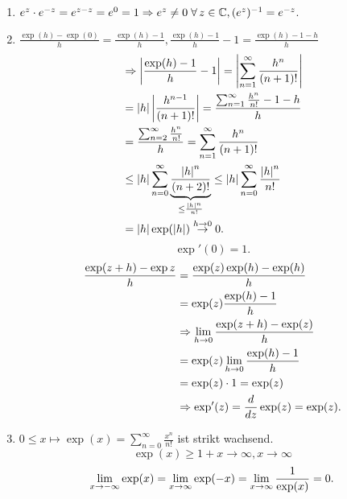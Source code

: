 \documentclass[../ana2.tex]{subfiles}
\begin{document}
\begin{bew}\leavevmode
    \begin{enumerate}[label=(\alph*)]
        \item \( e^z \cdot e^{-z} = e^{z-z} = e^0 = 1 
        \Rightarrow e^z \neq 0 \;\forall z\in\C, 
        (e^z)^{-1} = e^{-z} \).
        \item \( \frac{\exp(h) - \exp(0)}{h} = \frac{\exp(h) - 1}{h},
        \frac{\exp(h) - 1}{h} - 1 = \frac{\exp(h) -1-h}{h} \)
        \begin{align*}
            &\Rightarrow \left|\frac{\exp(h) - 1}{h} - 1\right| 
            = \left|\sum_{n=1}^{\infty} \frac{h^n}{(n+1)!}\right| \\
            &= \left|h\right|\left|\frac{h^{n-1}}{(n+1)!}\right| 
            = \frac{\sum_{n=1}^{\infty} \frac{h^n}{n!} -1 -h }{h} \\
            &= \frac{\sum_{n=2}^{\infty} \frac{h^n}{n!}}{h} 
            = \sum_{n=1}^{\infty} \frac{h^n}{(n+1)!} \\
            &\leq \left|h\right| \sum_{n=0}^{\infty} 
            \underbrace{\frac{\left|h\right|^n}{(n+2)!}}_{\leq \frac{\left|h\right|^n}{n!}} 
            \leq \left|h\right| \sum_{n=0}^{\infty} \frac{\left|h\right|^n}{n!} \\
            &= \left|h\right| \exp(\left|h\right|) \overset{h \rightarrow 0}{\rightarrow} 0.
        \end{align*}
        \[ \exp'(0) = 1. \]
        \begin{align*}
            \frac{ \exp(z + h) - \exp z }{h} 
            &= \frac{ \exp(z)\exp(h) - \exp(h) }{h} \\
            &= \exp(z) \frac{\exp(h) - 1}{h} \\
            &\Rightarrow \lim\limits_{h\rightarrow{}0} 
            \frac{\exp(z + h) - \exp(z)}{h} \\
            &= \exp(z) \lim\limits_{h\rightarrow{}0} \frac{\exp(h) - 1}{h} \\
            &= \exp(z) \cdot 1 = \exp(z) \\
            &\Rightarrow \exp'(z) = \frac{d}{dz} \exp(z) = \exp(z).
        \end{align*}
        \item \( 0 \leq x \mapsto \exp(x) 
        = \sum_{n=0}^\infty \frac{x^n}{n!} \) 
        ist strikt wachsend.
        \[ \exp(x) \geq 1 + x \rightarrow \infty, 
        x\rightarrow \infty \] 
        \[ \lim\limits_{x\rightarrow{}-\infty} \exp(x) 
        = \lim\limits_{x\rightarrow\infty} \exp(-x) = \lim\limits_{x\rightarrow\infty} \frac{1}{\exp(x)} = 0. \]
    

\end{enumerate}
\end{bew}
\end{document}
